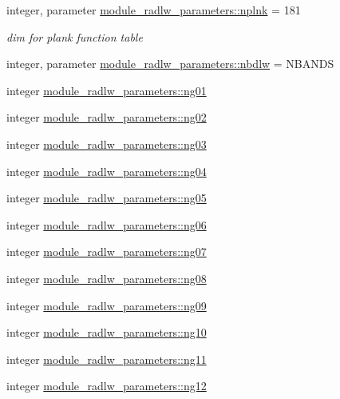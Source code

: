 \begin{DoxyCompactItemize}
integer, parameter \hyperlink{group__module__radlw__main_ga7ade2de4de94ec6e7a0e97321143e2e6}{module\+\_\+radlw\+\_\+parameters\+::nplnk} = 181
\begin{DoxyCompactList}\small\item\em dim for plank function table \end{DoxyCompactList}\item 
integer, parameter \hyperlink{group__module__radlw__main_ga39a115a97296886b2e6e37b220e942c7}{module\+\_\+radlw\+\_\+parameters\+::nbdlw} = N\+B\+A\+N\+DS
\item 
integer \hyperlink{group__module__radlw__main_ga54dc7913677d754af2b7ece9732b1280}{module\+\_\+radlw\+\_\+parameters\+::ng01}
\item 
integer \hyperlink{group__module__radlw__main_gaed66d66a4da744d27c13b57b41ba78c3}{module\+\_\+radlw\+\_\+parameters\+::ng02}
\item 
integer \hyperlink{group__module__radlw__main_gad226d9951e041e991f463a9a90e7f68b}{module\+\_\+radlw\+\_\+parameters\+::ng03}
\item 
integer \hyperlink{group__module__radlw__main_gafd05a94bc29e5a5d792c0c140fe3a0c4}{module\+\_\+radlw\+\_\+parameters\+::ng04}
\item 
integer \hyperlink{group__module__radlw__main_ga1e70690afc3ba2cca4344d6df3d26ee8}{module\+\_\+radlw\+\_\+parameters\+::ng05}
\item 
integer \hyperlink{group__module__radlw__main_ga9a176786a0df1e65165db9b3c6f0e582}{module\+\_\+radlw\+\_\+parameters\+::ng06}
\item 
integer \hyperlink{group__module__radlw__main_gab8f22f9ceabf3946452055c461476d49}{module\+\_\+radlw\+\_\+parameters\+::ng07}
\item 
integer \hyperlink{group__module__radlw__main_ga61aba0726187e15acf8bae5c377dbdd5}{module\+\_\+radlw\+\_\+parameters\+::ng08}
\item 
integer \hyperlink{group__module__radlw__main_ga2856b7576a44f2e35bd0fbc1e49bd270}{module\+\_\+radlw\+\_\+parameters\+::ng09}
\item 
integer \hyperlink{group__module__radlw__main_gaa764831e931a2ec27c763ebf957bbc67}{module\+\_\+radlw\+\_\+parameters\+::ng10}
\item 
integer \hyperlink{group__module__radlw__main_ga239b6c64459896a583e88c8ba2324348}{module\+\_\+radlw\+\_\+parameters\+::ng11}
\item 
integer \hyperlink{group__module__radlw__main_ga88f3b780d4dc9d4e45852fd41e111a21}{module\+\_\+radlw\+\_\+parameters\+::ng12}

\end{DoxyCompactItemize}
